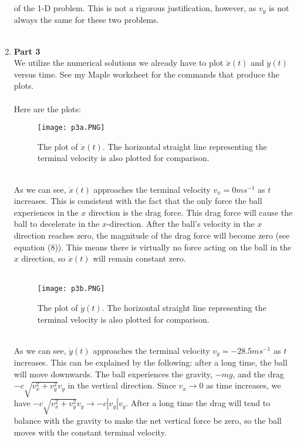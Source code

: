 \documentclass{article}
\begin{document}
\begin{enumerate}
  of the 1-D problem. This is not a rigorous justification, however, as \(v_y\) is not always the same for these two problems.
  \pagebreak \\ \\
  \item \textbf{Part 3}\\
  We utilize the numerical solutions we already have to plot \(\dot{x}(t)\) and \(\dot{y}(t)\) versus time.
  See my Maple worksheet for the commands that produce the plots. \\
  \\
  Here are the plots:
  \begin{figure}[ht]
      \centering
      \texttt{[image: p3a.PNG]}
      \caption{The plot of \(\dot{x}(t)\). The horizontal straight line representing the terminal velocity is also plotted for comparison. }
      \label{fig:label}
  \end{figure}\\
  As we can see, \(\dot{x}(t)\) approaches the terminal velocity \(v_x =0ms^{-1}\) as \(t\) increases. This is consistent with the fact that
  the only force the ball experiences in the \(x\) direction is the drag force. This drag force will cause the ball to decelerate
  in the \(x\)-direction. After the ball's velocity in the \(x\) direction reaches zero, the magnitude of the drag force will become zero (see equation (8)). This means there is virtually no force acting on the ball in the \(x\) direction, so \(\dot{x}(t)\)
  will remain constant zero.
  \pagebreak \\ \\
  \begin{figure}[ht]
      \centering
      \texttt{[image: p3b.PNG]}
      \caption{The plot of \(\dot{y}(t)\). The horizontal straight line representing the terminal velocity is also plotted for comparison. }
      \label{fig:label}
  \end{figure}\\
  As we can see, \(\dot{y}(t)\) approaches the terminal velocity \(v_y =-28.5ms^{-1}\) as \(t\) increases.
  This can be explained by the following: after a long time, the ball will move downwards. The ball experiences
  the gravity, \(-mg\), and the drag \(- c\sqrt{v_{x}^2 +v_y^2} v_y\) in the vertical direction. Since \(v_x\to 0\) as time increases,
  we have \(- c\sqrt{v_{x}^2 +v_y^2} v_y \to -c |v_y|v_y\). After a long time the drag will tend to balance with
  the gravity to make the net vertical force be zero, so the ball moves with the constant terminal velocity.

\end{enumerate}
\end{document}
